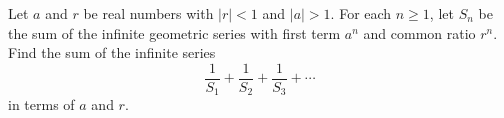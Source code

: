 Let $a$ and $r$ be real numbers with $|r|<1$ and $|a|>1$. For each $n\ge1$, let $S_n$ be the sum of the infinite geometric series with first term $a^n$ and common ratio $r^n$. Find the sum of the infinite series
\[\dfrac{1}{S_1}+\dfrac{1}{S_2}+\dfrac{1}{S_3}+\cdots\]
in terms of $a$ and $r$.
